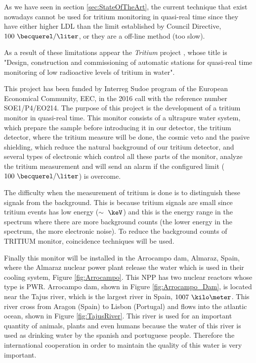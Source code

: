 As we have seen in section \ref{sec:StateOfTheArt}, the current technique that exist nowadays cannot be used for tritium monitoring in quasi-real time since they have either higher LDL than the limit established by Council Directive, $100~\becquerel/\liter$, or they are a off-line method (too slow). 

As a result of these limitations appear the \textit{Tritium} project \cite{TRITIUM}, whose title is "Design, construction and commissioning of automatic stations for quasi-real time monitoring of low radioactive levels of tritium in water".

This project has been funded by Interreg Sudoe program of the European Economical Community, EEC, in the 2016 call with the reference number SOE1/P4/EO214. The purpose of this project is the development of a tritium monitor in quasi-real time. This monitor consists of a ultrapure water system, which prepare the sample before introducing it in our detector, the tritium detector, where the tritium measure will be done, the cosmic veto and the pasive shielding, which reduce the natural background of our tritium detector, and several types of electronic which control all these parts of the monitor, analyze the tritium measurement and will send an alarm if the configured limit ($100~\becquerel/\liter$) is overcome.

The difficulty when the measurement of tritium is done is to distinguish these signals from the background. This is because tritium signals are small since tritium events has low energy ($\sim~\keV$) and this is the energy range in the spectrum where there are more background counts (the lower energy in the spectrum, the more electronic noise). To reduce the background counts of TRITIUM monitor, coincidence techniques will be used.

Finally this monitor will be installed in the Arrocampo dam, Almaraz, Spain, where the Almaraz nuclear power plant release the water which is used in their cooling system, Figure \ref{fig:Arrocampo}. This NPP has two nuclear reactors whose type is PWR. Arrocampo dam, shown in Figure \ref{fig:Arrocampo_Dam}, is located near the Tajus river, which is the largest river in Spain, $1007~\kilo\meter$. This river cross from Aragon (Spain) to Lisbon (Portugal) and flows into the atlantic ocean, shown in Figure \ref{fig:TajusRiver}. This river is used for an important quantity of animals, plants and even humans because the water of this river is used as drinking water by the spanish and portuguese people. Therefore the international cooperation in order to maintain the quality of this water is very important.

